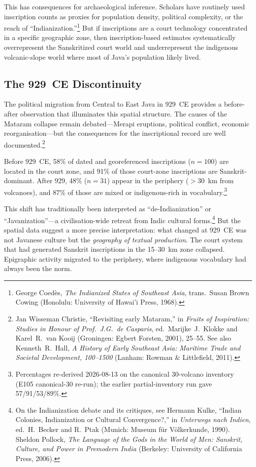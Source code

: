 \documentclass[12pt,a4paper]{article}
\begin{document}
This has consequences for archaeological inference.
Scholars have routinely used inscription counts as proxies for population density, political complexity, or the reach of ``Indianization.''\footnote{George Coed\`{e}s, \emph{The Indianized States of Southeast Asia}, trans.\ Susan Brown Cowing (Honolulu: University of Hawai'i Press, 1968).}
But if inscriptions are a court technology concentrated in a specific geographic zone, then inscription-based estimates systematically overrepresent the Sanskritized court world and underrepresent the indigenous volcanic-slope world where most of Java's population likely lived.

\subsection{The 929~CE Discontinuity}

The political migration from Central to East Java in 929~CE provides a before-after observation that illuminates this spatial structure.
The causes of the Mataram collapse remain debated---Merapi eruptions, political conflict, economic reorganisation---but the consequences for the inscriptional record are well documented.\footnote{Jan Wisseman Christie, ``Revisiting early Mataram,'' in \emph{Fruits of Inspiration: Studies in Honour of Prof.\ J.G.\ de Casparis}, ed.\ Marijke~J.\ Klokke and Karel~R.\ van Kooij (Groningen: Egbert Forsten, 2001), 25--55. See also Kenneth~R.\ Hall, \emph{A History of Early Southeast Asia: Maritime Trade and Societal Development, 100--1500} (Lanham: Rowman \& Littlefield, 2011).}

Before 929~CE, 58\% of dated and georeferenced inscriptions ($n=100$) are located in the court zone, and 91\% of those court-zone inscriptions are Sanskrit-dominant.
After 929, 48\% ($n=31$) appear in the periphery ($>$30~km from volcanoes), and 87\% of those are mixed or indigenous-rich in vocabulary.\footnote{Percentages re-derived 2026-08-13 on the canonical 30-volcano inventory (E105 canonical-30 re-run); the earlier partial-inventory run gave 57/91/53/89\%.}

This shift has traditionally been interpreted as ``de-Indianization'' or ``Javanization''---a civilisation-wide retreat from Indic cultural forms.\footnote{On the Indianization debate and its critiques, see Hermann Kulke, ``Indian Colonies, Indianization or Cultural Convergence?,'' in \emph{Unterwegs nach Indien}, ed.\ H.\ Becker and R.\ Ptak (Munich: Museum f\"{u}r V\"{o}lkerkunde, 1990). Sheldon Pollock, \emph{The Language of the Gods in the World of Men: Sanskrit, Culture, and Power in Premodern India} (Berkeley: University of California Press, 2006).}
But the spatial data suggest a more precise interpretation: what changed at 929~CE was not Javanese culture but the \emph{geography of textual production}.
The court system that had generated Sanskrit inscriptions in the 15--30~km zone collapsed.
Epigraphic activity migrated to the periphery, where indigenous vocabulary had always been the norm.
\end{document}
